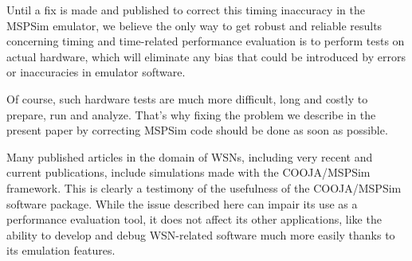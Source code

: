 \documentclass[a4paper,10pt]{article}
\begin{document}
\medskip

Until a fix is made and published to correct this timing inaccuracy
in the MSPSim emulator, we believe the only way to get robust and reliable
results concerning timing and time-related performance evaluation is
to perform tests on actual hardware, which will eliminate any bias
that could be introduced by errors or inaccuracies in emulator software.

Of course, such hardware tests are much more difficult, long and
costly to prepare, run and analyze. That's why fixing the problem
we describe in the present paper by correcting MSPSim code should
be done as soon as possible.

Many published articles in the domain of WSNs, including very recent
and current publications, include simulations made with the COOJA/MSPSim
framework. This is clearly a testimony of the usefulness of the COOJA/MSPSim
software package. While the issue described here can impair its use as
a performance evaluation tool, it does not affect its other applications,
like the ability to develop and debug WSN-related software much more easily
thanks to its emulation features.




{\small
}
\end{document}
